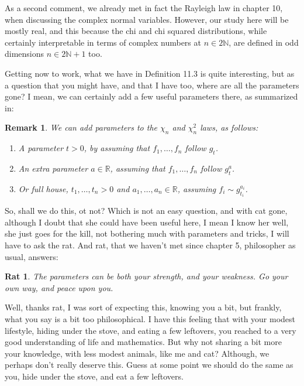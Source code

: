 \documentclass[12pt]{amsbook}
\newtheorem{rat}[theorem]{Rat}
\newtheorem{remark}[theorem]{Remark}
\begin{document}
As a second comment, we already met in fact the Rayleigh law in chapter 10, when discussing the complex normal variables. However, our study here will be mostly real, and this because the chi and chi squared distributions, while certainly interpretable in terms of complex numbers at $n\in 2\mathbb N$, are defined in odd dimensions $n\in2\mathbb N+1$ too.

\bigskip

Getting now to work, what we have in Definition 11.3 is quite interesting, but as a question that you might have, and that I have too, where are all the parameters gone? I mean, we can certainly add a few useful parameters there, as summarized in:

\begin{remark}
We can add parameters to the $\chi_n$ and $\chi_n^2$ laws, as follows:
\begin{enumerate}
\item A parameter $t>0$, by assuming that $f_1,\ldots,f_n$ follow $g_t$.

\item An extra parameter $a\in\mathbb R$, assuming that $f_1,\ldots,f_n$ follow $g_t^a$.

\item Or full house, $t_1,\ldots,t_n>0$ and $a_1,\ldots,a_n\in\mathbb R$, assuming $f_i\sim g_{t_i}^{a_i}$.
\end{enumerate}
\end{remark}

So, shall we do this, ot not? Which is not an easy question, and with cat gone, although I doubt that she could have been useful here, I mean I know her well, she just goes for the kill, not bothering much with parameters and tricks, I will have to ask the rat. And rat, that we haven't met since chapter 5, philosopher as usual, answers:

\begin{rat}
The parameters can be both your strength, and your weakness. Go your own way, and peace upon you.
\end{rat}

Well, thanks rat, I was sort of expecting this, knowing you a bit, but frankly, what you say is a bit too philosophical. I have this feeling that with your modest lifestyle, hiding under the stove, and eating a few leftovers, you reached to a very good understanding of life and mathematics. But why not sharing a bit more your knowledge, with less modest animals, like me and cat? Although, we perhaps don't really deserve this. Guess at some point we should do the same as you, hide under the stove, and eat a few leftovers.
\end{document}
